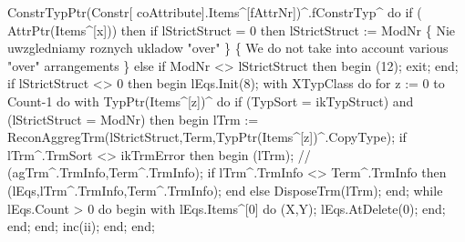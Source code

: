          ConstrTypPtr(Constr[ coAttribute].Items^[fAttrNr])^.fConstrTyp^ do
            if ( AttrPtr(Items^[x])) then
               if lStrictStruct = 0 then lStrictStruct := ModNr
                  \{ Nie uwzgledniamy roznych ukladow "over" \}
                  \{ We do not take into account various "over" arrangements \}
               else if ModNr <> lStrictStruct then
               begin
                  (12);
                  exit;
               end;
         if lStrictStruct <> 0 then
         begin
            lEqs.Init(8);
            with XTypClass do
               for z := 0 to Count-1 do
                  with TypPtr(Items^[z])^ do
                     if (TypSort = ikTypStruct) and (lStrictStruct = ModNr) then
                     begin
                        lTrm := ReconAggregTrm(lStrictStruct,Term,TypPtr(Items^[z])^.CopyType);
                        if lTrm^.TrmSort <> ikTrmError then
                        begin
                           (lTrm);
                           //             (agTrm^.TrmInfo,Term^.TrmInfo);
                           if lTrm^.TrmInfo <> Term^.TrmInfo then
                              (lEqs,lTrm^.TrmInfo,Term^.TrmInfo);
                        end
                        else DisposeTrm(lTrm);
                     end;
            while lEqs.Count > 0 do
            begin
               with lEqs.Items^[0] do (X,Y);
               lEqs.AtDelete(0);
            end;
         end;
      end;
      inc(ii);
   end;
end;
\eatline
{}\nwendcode{}\nwdocspar
